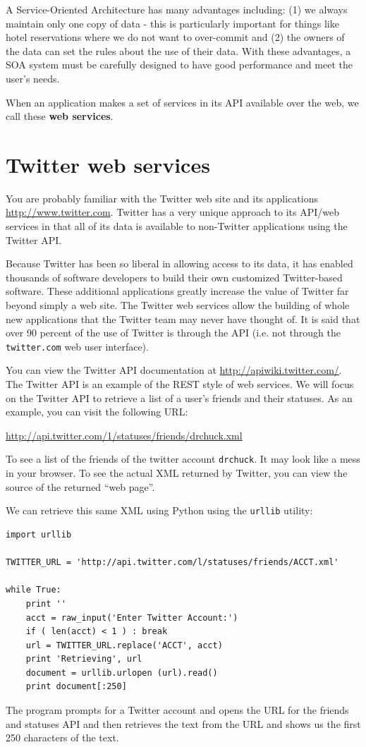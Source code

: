 \documentclass[10pt]{book}
\begin{document}
A Service-Oriented Architecture has many advantages including: (1) we 
always maintain only one copy of data - this is particularly important
for things like hotel reservations where we do not want to over-commit
and (2) the owners of the data can set the rules about the use of their 
data.   With these advantages, a SOA system must be carefully designed
to have good performance and meet the user's needs.

When an application makes a set of services in its API available over the web, 
we call these {\bf web services}. 

\section{Twitter web services}

You are probably familiar with the Twitter web site and its
applications \url{http://www.twitter.com}.  Twitter has a very unique
approach to its API/web services in that all of its data is available
to non-Twitter applications using the Twitter API.

Because Twitter has been so liberal in allowing access to its data,
it has enabled thousands of software developers to build their own
customized Twitter-based software.  These additional applications greatly
increase the value of Twitter far beyond simply a web site.  The 
Twitter web services allow the building of whole new applications that
the Twitter team may never have thought of.  It is said that over 90 percent
of the use of Twitter is through the API (i.e. not through the {\tt twitter.com}
web user interface).

You can view the Twitter API documentation at 
\url{http://apiwiki.twitter.com/}.  The Twitter API is an example
of the REST style of web services.
We will focus on the Twitter API
to retrieve a list of a user's friends and their statuses.  As an 
example, you can visit the following URL:

\url{http://api.twitter.com/1/statuses/friends/drchuck.xml}

To see a list of the friends of the twitter account {\tt drchuck}.
It may look like a mess in your browser.   To see the actual XML
returned by Twitter, you can view the source of the returned
``web page''.

We can retrieve this same XML using Python using the {\tt urllib}
utility:

\beforeverb
\begin{verbatim}
import urllib

TWITTER_URL = 'http://api.twitter.com/l/statuses/friends/ACCT.xml'

while True:
    print ''
    acct = raw_input('Enter Twitter Account:')
    if ( len(acct) < 1 ) : break
    url = TWITTER_URL.replace('ACCT', acct)
    print 'Retrieving', url
    document = urllib.urlopen (url).read()
    print document[:250]
\end{verbatim}
\afterverb
%
The program prompts for a Twitter account and opens the URL
for the friends and statuses API and then retrieves the 
text from the URL and shows us the first 250 characters of
the text.
\end{document}
